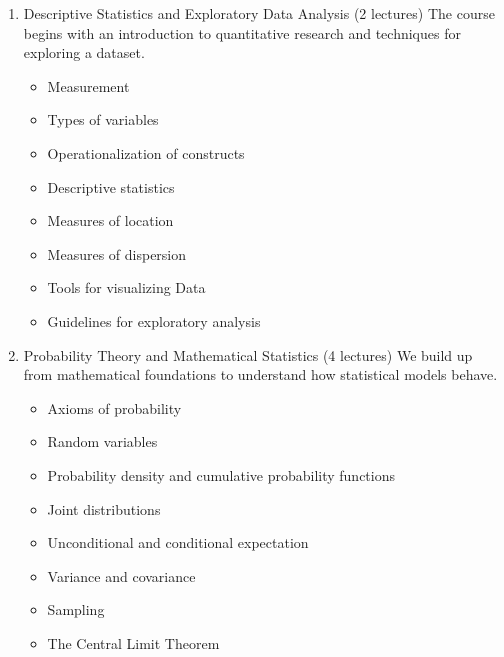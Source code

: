 \documentclass[11pt, a4paper]{article}
\begin{document}
  
\begin{enumerate}

  \item Descriptive Statistics and Exploratory Data Analysis (2 lectures)
  The course begins with an introduction to quantitative research and techniques for exploring a dataset.
    \begin{itemize}
	\item Measurement
	\item Types of variables
	\item Operationalization of constructs
	\item Descriptive statistics
	\item Measures of location
	\item Measures of dispersion
	\item Tools for visualizing Data
	\item Guidelines for exploratory analysis
    \end{itemize}

  \item Probability Theory and Mathematical Statistics (4 lectures)  
  We build up from mathematical foundations to understand how statistical models behave.    
  \begin{itemize}
    \item Axioms of probability
      \item Random variables
      \item Probability density and cumulative probability functions
      \item Joint distributions
      \item Unconditional and conditional expectation
      \item Variance and covariance 
      \item Sampling
      \item The Central Limit Theorem
    \end{itemize}


\end{enumerate}
\end{document}
